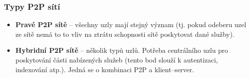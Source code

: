 \documentclass[11pt,a4paper]{article}
\begin{document}
\subsubsection{Typy P2P sítí}
\begin{itemize}
\item \textbf{Pravé P2P sítě} -- všechny uzly mají stejný význam (tj. pokud odeberu uzel ze sítě nemá to to vliv na ztrátu schopnosti sítě poskytovat dané služby).
\item \textbf{Hybridní P2P sítě} -- několik typů uzlů. Potřeba centrálního uzlu pro poskytování části nabízených služeb (tento bod slouží k autentizaci, indexování atp.). Jedná se o kombinaci P2P a klient--server.
\end{itemize}
\end{document}
